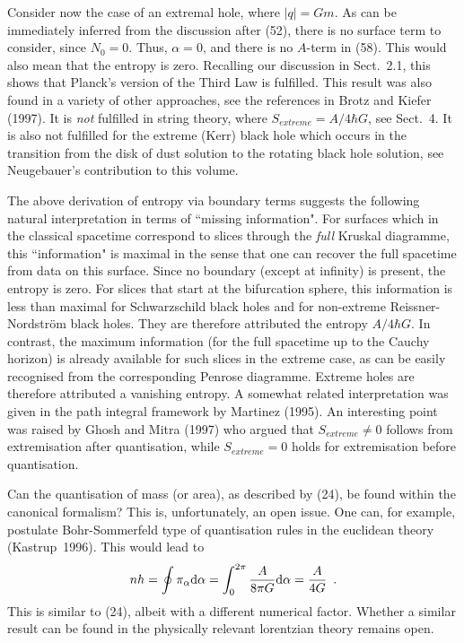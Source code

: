 \documentclass[12pt]{article}
\def\D{{\rm d}}
\newcommand{\be}{\begin{equation}}
\newcommand{\ee}{\end{equation}}
\begin{document}
Consider now the case of an extremal hole, where $\vert q\vert =Gm$.
As can be immediately inferred from the discussion after (52),
there is no surface term to consider, since $N_0=0$.
Thus, $\alpha=0$, and there is no $A$-term in (58).
This would also mean that the entropy is zero.
Recalling our discussion in Sect.~2.1, this shows that Planck's
version of the Third Law is fulfilled. This result was also
found in a variety of other approaches, see the references
in Brotz and Kiefer (1997). It is {\em not} fulfilled in string theory,
where $S_{extreme}=A/4\hbar G$, see Sect.~4.
It is also not fulfilled for the extreme (Kerr) black hole which
occurs in the transition from the disk of dust solution to
the rotating black hole solution, see Neugebauer's contribution
to this volume.

The above derivation of entropy via boundary terms suggests the
following natural interpretation in terms of ``missing
information". For surfaces which in the classical spacetime
correspond to slices through the {\em full} Kruskal diagramme, this
``information" is maximal in the sense that one can recover 
the full spacetime from data on this surface. Since no boundary
(except at infinity) is present, the entropy is zero.
For slices that start at the bifurcation sphere, this information
is less than maximal for Schwarzschild black holes and for
non-extreme Reissner-Nordstr\"om black holes. They are therefore
attributed the entropy $A/4\hbar G$. In contrast, the maximum
information (for the full spacetime up to the Cauchy horizon)
is already available for such slices in the
extreme case, as can be easily recognised from the corresponding
Penrose diagramme. Extreme holes are therefore attributed
a vanishing entropy. A somewhat related interpretation was given
in the path integral framework by Martinez (1995).
An interesting point was raised by Ghosh and Mitra (1997)
who argued that $S_{extreme}\neq0$ follows from extremisation
after quantisation, while $S_{extreme}=0$ holds for 
extremisation before quantisation.

Can the quantisation of mass (or area), as described by (24),
be found within the canonical formalism? This is, unfortunately, an 
open issue. One can, for example, postulate Bohr-Sommerfeld type
of quantisation rules in the euclidean theory (Kastrup~1996).
This would lead to
\be nh=\oint\pi_{\alpha}\D\alpha= \int_0^{2\pi}\frac{A}{8\pi G}
        \D\alpha=\frac{A}{4G}\enspace . \ee
This is similar to (24), albeit with a different numerical factor.
Whether a similar result can be found in the physically relevant
lorentzian theory remains open.
\end{document}
